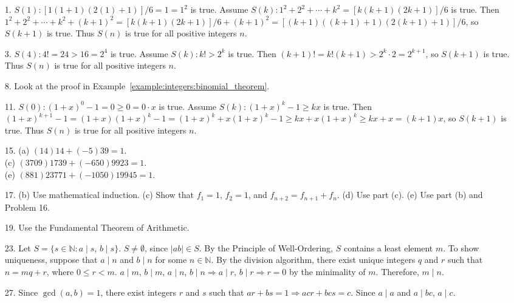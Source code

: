  
{\small
\begin{itemize}
 
 
\item[1.]
$S(1): [1(1+1)(2(1) + 1)]/6 = 1 = 1^2$ is true. Assume $S(k): 1^2 +2^2
+ \cdots + k^2 = [k(k+1)(2k+1)]/6$ is true. Then $1^2 + 2^2 + \cdots +
k^2 + (k+1)^2 = [k(k+1)(2k+1)]/6 + (k+1)^2 = [(k+1)((k+1) +1)(2(k+1) +
1)]/6$, so $S(k+1)$ is true. Thus $S(n)$ is true for all positive
integers $n$. 
 
\item[3.]
$S(4): 4! = 24 > 16 =2^4$ is true. Assume $S(k): k! >2^k$ is true.
Then $(k+1)! = k! (k+1) > 2^k \cdot 2 = 2^{k+1}$, so $S(k+1)$ is true.
Thus $S(n)$ is true for all positive integers $n$. 
 
 
\item[8.]
Look at the proof in Example~\ref{example:integers:binomial_theorem}.
 
\item[11.]
$S(0): (1+x)^0 -1 = 0 \geq 0 = 0 \cdot x$ is true. Assume $S(k):
(1+x)^k -1 \geq kx$ is true. Then $(1+x)^{k+1} - 1 = (1+x)(1+x)^k -1 =
(1+x)^k + x(1+x)^k -1 \geq kx + x(1+x)^k \geq kx + x = (k+1)x$, so
$S(k+1)$ is true. Thus $S(n)$ is true for all positive integers $n$.
 
 
\item[15.]
(a) $(14)14 + (-5)39 = 1$.\\
(c) $(3709) 1739 + (-650) 9923 = 1$.\\
(e) $(881) 23771 + (-1050) 19945 = 1$.
 
 
\item[17.]
(b) Use mathematical induction.
(c) Show that $f_1 = 1$, $f_2 = 1$, and $f_{n + 2}
= f_{n + 1} + f_n$.
(d) Use part (c).
(e) Use part (b) and Problem 16.
 
 
\item[19.]
Use the Fundamental Theorem of Arithmetic.
 
 
\item[23.]
Let $S = \{s \in {\mathbb N} : a \mid s$, $b \mid s \}$. $S \neq \emptyset$,
since $|ab| \in S$. By the Principle of Well-Ordering, $S$ contains a
least element $m$. To show uniqueness, suppose that $a \mid n$ and $b
\mid n$ for some $n \in {\mathbb N}$. By the division algorithm, there
exist unique integers $q$ and $r$ such that $n = mq + r$, where $0
\leq r < m$. $a \mid m$, $b \mid m$, $a \mid n$, $b \mid n \Rightarrow a
\mid r$, $b \mid r \Rightarrow r = 0$ by the minimality of $m$.
Therefore, $m \mid n$. 
 
 
\item[27.]
Since $\gcd(a,b)=1$, there exist integers $r$ and $s$ such that $ar +
bs =1 \Rightarrow acr+bcs =c$. Since $a \mid a$ and $a \mid bc$, $a
\mid c$.
 

\end{itemize}}
